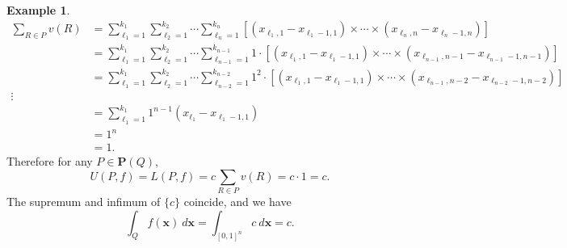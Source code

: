 \documentclass{article}
\newcommand{\x}{\mathbf{x}}
\newcommand{\brk}[1]{ \left[#1\right] }
\newcommand{\paren}[1]{ \left(#1\right) }
\theoremstyle{definition}
\newtheorem{example}{Example}[section]
\begin{document}
\begin{example}
\begin{align*}
	\sum_{R\in P} v(R) &= \sum_{\ell _1 = 1}^{k_1}\sum_{\ell _2 = 1}^{k_2}\cdots \sum_{\ell _n = 1}^{k_n}\brk{\paren{x_{\ell_1,1} - x_{\ell_1-1,1}}\times \cdots \times \paren{x_{\ell_n,n} - x_{\ell_n-1,n}}}\\ 
	& = \sum_{\ell _1 = 1}^{k_1}\sum_{\ell _2 = 1}^{k_2}\cdots \sum_{\ell _{n-1} = 1}^{k_{n-1}}1\cdot \brk{\paren{x_{\ell_1,1} - x_{\ell_1-1,1}}\times \cdots \times \paren{x_{\ell_{n-1},{n-1}} - x_{\ell_{n-1}-1,{n-1}}}}\\ 
	& = \sum_{\ell _1 = 1}^{k_1}\sum_{\ell _2 = 1}^{k_2}\cdots \sum_{\ell _{n-2} = 1}^{k_{n-2}}1^2\cdot \brk{\paren{x_{\ell_1,1} - x_{\ell_1-1,1}}\times \cdots \times \paren{x_{\ell_{n-1},{n-2}} - x_{\ell_{n-2}-1,{n-2}}}}\\ 
	\vdots &\\
	& = \sum_{\ell _1 = 1}^{k_1}1^{n-1}	\paren{x_{\ell_1} - x_{\ell_1 -1,1}}\\ 
	& = 1^n\\
	& = 1.
\end{align*}
Therefore for any $ P\in \mathbf P (Q) $, $$ U(P,f)=L(P,f) = c\sum_{R\in P} v(R)= c\cdot 1 = c .$$
The supremum and infimum of $ \{c\}  $ coincide, and we have $$ \int_Q f(\x) \ d\x = \int_{[0,1]^n}c\ d\x = c.$$
\end{example}
\end{document}
